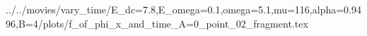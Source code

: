 ../../movies/vary_time/E_dc=7.8,E_omega=0.1,omega=5.1,mu=116,alpha=0.9496,B=4/plots/f_of_phi_x_and_time_A=0_point_02_fragment.tex